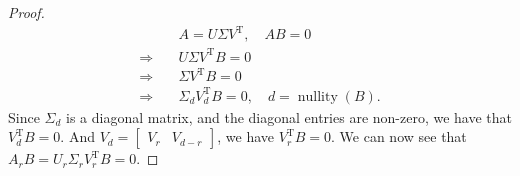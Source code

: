 \documentclass{article}
\newcommand{\T}{\mathrm{T}}
\theoremstyle{plain}
\theoremstyle{definition}
\theoremstyle{remark}
\theoremstyle{remark}
\begin{document}
  \begin{proof}
    \begin{align*}
      \quad &A = U\Sigma V^{\T}, \quad AB = 0 \\
      \Rightarrow \quad &U\Sigma V^{\T} B = 0 \\
      \Rightarrow \quad &\Sigma V^{\T} B = 0 \\
      \Rightarrow \quad &\Sigma_d V_d^{\T} B = 0, \quad d = \operatorname*{nullity}(B).
      \end{align*}
      Since $\Sigma_d$ is a diagonal matrix, and the diagonal entries are non-zero, we have that $V_d^{\T} B = 0$. And $V_d = \begin{bmatrix} V_r & V_{d-r} \end{bmatrix}$, we have $V_r^{\T} B= 0$. We can now see that $A_r B = U_r \Sigma_r V_r^{\T} B = 0$.
  \end{proof}
\end{document}
